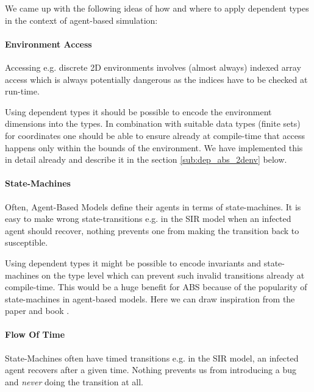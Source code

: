 We came up with the following ideas of how and where to apply dependent types in the context of agent-based simulation:



\paragraph{Environment Access}
Accessing e.g. discrete 2D environments involves (almost always) indexed array access which is always potentially dangerous as the indices have to be checked at run-time.

Using dependent types it should be possible to encode the environment dimensions into the types. In combination with suitable data types (finite sets) for coordinates one should be able to ensure already at compile-time that access happens only within the bounds of the environment. We have implemented this in detail already and describe it in the section \ref{sub:dep_abs_2denv} below.

\paragraph{State-Machines}
Often, Agent-Based Models define their agents in terms of state-machines. It is easy to make wrong state-transitions e.g. in the SIR model when an infected agent should recover, nothing prevents one from making the transition back to susceptible. 

Using dependent types it might be possible to encode invariants and state-machines on the type level which can prevent such invalid transitions already at compile-time. This would be a huge benefit for ABS because of the popularity of state-machines in agent-based models. Here we can draw inspiration from the paper \cite{brady_state_2016} and book \cite{brady_type-driven_2017}.

\paragraph{Flow Of Time}
State-Machines often have timed transitions e.g. in the SIR model, an infected agent recovers after a given time. Nothing prevents us from introducing a bug and \textit{never} doing the transition at all.


